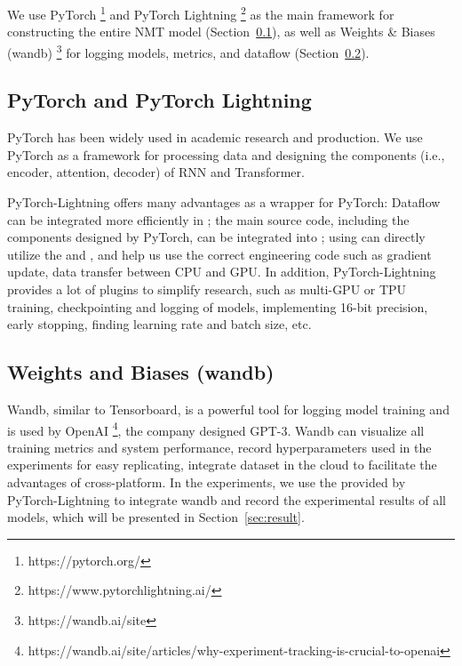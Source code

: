 We use PyTorch \footnote{https://pytorch.org/} and PyTorch Lightning \footnote{https://www.pytorchlightning.ai/} \cite{falcon2019pytorch}  as the main framework for constructing the entire NMT model (Section~\ref{sec:lightning}), as well as Weights \& Biases (wandb) \footnote{https://wandb.ai/site} \cite{wandb} for logging models, metrics, and dataflow (Section~\ref{sec:wandb}).

\subsection{PyTorch and PyTorch Lightning} \label{sec:lightning}

PyTorch has been widely used in academic research and production. We use PyTorch as a framework for processing data and designing the components (i.e., encoder, attention, decoder) of RNN and Transformer.

PyTorch-Lightning offers many advantages as a wrapper for PyTorch: Dataflow can be integrated more efficiently in ; the main source code, including the components designed by PyTorch, can be integrated into ; using  can directly utilize the  and , and help us use the correct engineering code such as gradient update, data transfer between CPU and GPU. In addition, PyTorch-Lightning provides a lot of plugins to simplify research, such as multi-GPU or TPU training, checkpointing and logging of models, implementing 16-bit precision, early stopping, finding learning rate and batch size, etc.

\subsection{Weights and Biases (wandb)} \label{sec:wandb}

Wandb, similar to Tensorboard, is a powerful tool for logging model training and is used by OpenAI \footnote{https://wandb.ai/site/articles/why-experiment-tracking-is-crucial-to-openai}, the company designed GPT-3. Wandb can visualize all training metrics and system performance, record hyperparameters used in the experiments for easy replicating, integrate dataset in the cloud to facilitate the advantages of cross-platform. In the experiments, we use the  provided by PyTorch-Lightning to integrate wandb and record the experimental results of all models, which will be presented in Section~\ref{sec:result}.


